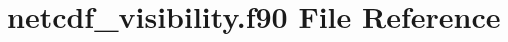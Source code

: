 \hypertarget{netcdf__visibility_8f90}{}\section{netcdf\+\_\+visibility.\+f90 File Reference}
\label{netcdf__visibility_8f90}
